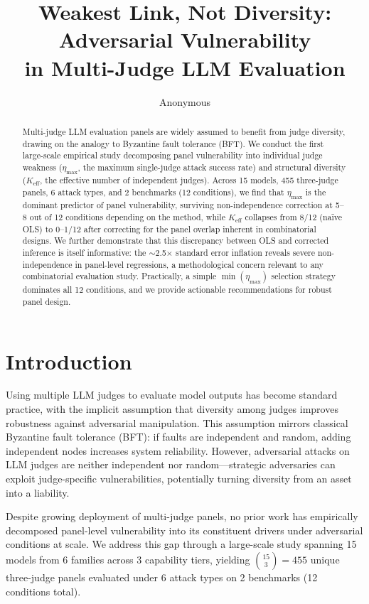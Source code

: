 \documentclass[11pt,a4paper]{article}
\title{Weakest Link, Not Diversity: Adversarial Vulnerability \\in Multi-Judge LLM Evaluation}
\author{Anonymous}
\newcommand{\etamax}{\ensuremath{\eta_{\max}}}
\newcommand{\keff}{\ensuremath{K_{\text{eff}}}}
\begin{document}
\maketitle

\begin{abstract}
Multi-judge LLM evaluation panels are widely assumed to benefit from judge diversity, drawing on the analogy to Byzantine fault tolerance (BFT).
We conduct the first large-scale empirical study decomposing panel vulnerability into individual judge weakness ($\etamax$, the maximum single-judge attack success rate) and structural diversity ($\keff$, the effective number of independent judges).
Across 15 models, 455 three-judge panels, 6 attack types, and 2 benchmarks (12 conditions), we find that $\etamax$ is the dominant predictor of panel vulnerability, surviving non-independence correction at 5--8 out of 12 conditions depending on the method, while $\keff$ collapses from 8/12 (na\"ive OLS) to 0--1/12 after correcting for the panel overlap inherent in combinatorial designs.
We further demonstrate that this discrepancy between OLS and corrected inference is itself informative: the $\sim$2.5$\times$ standard error inflation reveals severe non-independence in panel-level regressions, a methodological concern relevant to any combinatorial evaluation study.
Practically, a simple $\min(\etamax)$ selection strategy dominates all 12 conditions, and we provide actionable recommendations for robust panel design.
\end{abstract}

\section{Introduction}
\label{sec:intro}

Using multiple LLM judges to evaluate model outputs has become standard practice, with the implicit assumption that diversity among judges improves robustness against adversarial manipulation.
This assumption mirrors classical Byzantine fault tolerance (BFT): if faults are independent and random, adding independent nodes increases system reliability.
However, adversarial attacks on LLM judges are neither independent nor random---strategic adversaries can exploit judge-specific vulnerabilities, potentially turning diversity from an asset into a liability.

Despite growing deployment of multi-judge panels, no prior work has empirically decomposed panel-level vulnerability into its constituent drivers under adversarial conditions at scale.
We address this gap through a large-scale study spanning 15 models from 6 families across 3 capability tiers, yielding $\binom{15}{3}=455$ unique three-judge panels evaluated under 6 attack types on 2 benchmarks (12 conditions total).
\end{document}
